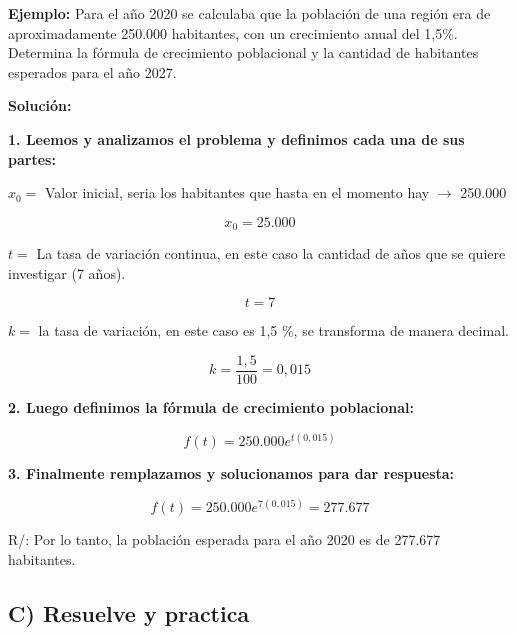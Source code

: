 \documentclass[12pt,a4paper]{article}
\begin{document}
\vspace{0.5cm}

\textbf{Ejemplo:} Para el año 2020 se calculaba que la población de una región era de aproximadamente 250.000 habitantes, con un crecimiento anual del 1,5\%. Determina la fórmula de crecimiento poblacional y la cantidad de habitantes esperados para el año 2027.

\textbf{Solución:}

\textbf{1. Leemos y analizamos el problema y definimos cada una de sus partes:}

$x_0 =$ Valor inicial, seria los habitantes que hasta en el momento hay $\longrightarrow$ 250.000

$$x_0 = 25.000$$

$t =$ La tasa de variación continua, en este caso la cantidad de años que se quiere investigar (7 años).

$$t = 7$$

$k =$ la tasa de variación, en este caso es 1,5 \%, se transforma de manera decimal.

$$k = \frac{1,5}{100} = 0,015$$

\textbf{2. Luego definimos la fórmula de crecimiento poblacional:}

$$f(t) = 250.000e^{t(0,015)}$$

\textbf{3. Finalmente remplazamos y solucionamos para dar respuesta:}

$$f(t) = 250.000e^{7(0,015)} = 277.677$$

R/: Por lo tanto, la población esperada para el año 2020 es de 277.677 habitantes.

\vspace{5mm}


\subsection*{C) Resuelve y practica}
\end{document}
